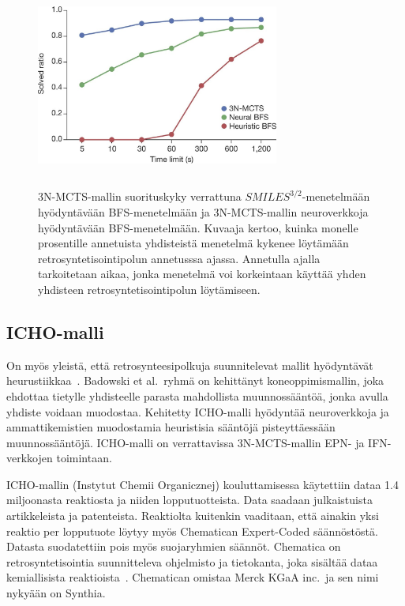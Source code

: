 \documentclass[finnish,twoside,censored,tkt,sw-line]{HYthesisML}
\begin{document}
\begin{figure}[!ht]
    \centering
    \includegraphics[width=8cm, height=6cm]{3N-MCTS-performance-fig.jpg}
    \caption{
        3N-MCTS-mallin suorituskyky verrattuna \(SMILES^{3/2}\)-menetelmään hyödyntävään BFS-menetelmään ja 3N-MCTS-mallin neuroverkkoja hyödyntävään BFS-menetelmään.
        Kuvaaja kertoo, kuinka monelle prosentille annetuista yhdisteistä menetelmä kykenee löytämään retrosyntetisointipolun annetusssa ajassa.
        Annetulla ajalla tarkoitetaan aikaa, jonka menetelmä voi korkeintaan käyttää yhden yhdisteen retrosyntetisointipolun löytämiseen.
    }
    {\cite{SeglerMarwinHS2018Pcsw}}
    {\label{fig:3n-mcts-performance}}
\end{figure}

\subsection{ICHO-malli}

On myös yleistä, että retrosynteesipolkuja suunnitelevat mallit hyödyntävät heurustiikkaa~\cite{ExpertKnowledgeRetorsynthesis}.
Badowski et al.\ ryhmä on kehittänyt koneoppimismallin, joka ehdottaa tietylle yhdisteelle parasta mahdollista muunnossääntöä, jonka avulla yhdiste voidaan muodostaa.
Kehitetty ICHO-malli hyödyntää  neuroverkkoja ja ammattikemistien muodostamia heuristisia sääntöjä pisteyttäessään muunnossääntöjä.
ICHO-malli on verrattavissa 3N-MCTS-mallin EPN- ja IFN-verkkojen toimintaan.

ICHO-mallin (Instytut Chemii Organicznej) kouluttamisessa käytettiin dataa 1.4 miljoonasta reaktiosta ja niiden lopputuotteista.
Data saadaan julkaistuista artikkeleista ja patenteista.
Reaktiolta kuitenkin vaaditaan, että ainakin yksi reaktio per lopputuote löytyy myös Chematican Expert-Coded säännöstöstä.
Datasta suodatettiin pois myös suojaryhmien säännöt.
Chematica on retrosyntetisointia suunnitteleva ohjelmisto ja tietokanta, joka sisältää dataa kemiallisista reaktioista~\cite{synthia}.
Chematican omistaa Merck KGaA inc.\ ja sen nimi nykyään on Synthia.
\end{document}
